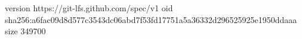 version https://git-lfs.github.com/spec/v1
oid sha256:a6fac09d8d577c3543dc06abd7f53fd17751a5a36332d296525925e1950ddaaa
size 349700
